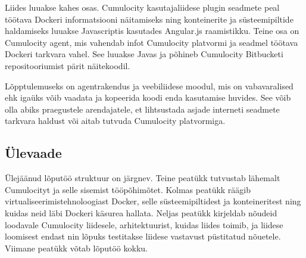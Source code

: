 \documentclass[12pt]{article}
\begin{document}
  Liides luuakse kahes osas. Cumulocity kasutajaliidese plugin seadmete peal töötava
  Dockeri informatsiooni näitamiseks ning konteinerite ja süsteemipiltide haldamiseks
  luuakse Javascriptis kasutades Angular.js raamistikku. Teine osa on Cumulocity agent,
  mis vahendab infot Cumulocity platvormi ja seadmel töötava Dockeri tarkvara vahel.
  See luuakse Javas ja põhineb Cumulocity Bitbucketi
  repositooriumist pärit näitekoodil.

  Lõpptulemuseks on agentrakendus ja veebiliidese moodul, mis on vabavaralised ehk igaüks võib
  vaadata ja kopeerida koodi enda kasutamise huvides. See võib olla abiks praegustele
  arendajatele, et lihtsustada asjade interneti seadmete tarkvara haldust või aitab
  tutvuda Cumulocity platvormiga.


  \subsection{Ülevaade}
  Ülejäänud lõputöö struktuur on järgnev.
  Teine peatükk tutvustab lähemalt Cumulocityt ja selle sisemist tööpõhimõtet. Kolmas peatükk
  räägib virtualiseerimistehnoloogiast Docker, selle süsteemipiltidest ja konteineritest
  ning kuidas neid läbi Dockeri käsurea hallata. Neljas peatükk kirjeldab nõudeid loodavale
  Cumulocity liidesele, arhitektuurist, kuidas liides toimib, ja liidese loomisest endast
  nin lõpuks testitakse liidese vastavust püstitatud nõuetele. Viimane peatükk võtab
  lõputöö kokku.






\end{document}
